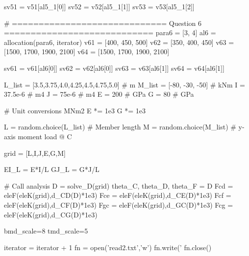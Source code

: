 \documentclass[a4paper,11pt]{article}
\begin{document}
\begin{pycode}
	sv51 = v51[al5_1[0]]
	sv52 = v52[al5_1[1]]
	sv53 = v53[al5_1[2]]
	
	# ============================= Question 6 ============================
	para6 = [3, 4]
	al6 = allocation(para6, iterator)
	v61 = [400, 450, 500]
	v62 = [350, 400, 450]
	v63 = [1500, 1700, 1900, 2100]
	v64 = [1500, 1700, 1900, 2100]
	
	sv61 = v61[al6[0]]
	sv62 = v62[al6[0]]
	sv63 = v63[al6[1]]
	sv64 = v64[al6[1]]
	
	L_list = [3.5,3.75,4.0,4.25,4.5,4.75,5.0]  # m
	M_list = [-80, -30, -50]	# kNm
	I = 37.5e-6 	# m4
	J = 75e-6   	# m4
	E = 200     	# GPa
	G = 80      	# GPa
	
	# Unit conversions MNm2
	E *= 1e3
	G *= 1e3
	
	L = random.choice(L_list) 		# Member length
	M = random.choice(M_list) 		# y-axis moment load @ C
	
	grid = [L,I,J,E,G,M]
	
	EI_L = E*I/L
	GJ_L = G*J/L
	
	# Call analysis
	D = solve_D(grid)
	theta_C, theta_D, theta_F = D
	Fcd = eleF(eleK(grid),d_CD(D)*1e3)
	Fce = eleF(eleK(grid),d_CE(D)*1e3)
	Fcf = eleF(eleK(grid),d_CF(D)*1e3)
	Fgc = eleF(eleK(grid),d_GC(D)*1e3)
	Fcg = eleF(eleK(grid),d_CG(D)*1e3)
	
	bmd_scale=8
	tmd_scale=5
	
	iterator = iterator + 1
	fn = open('read2.txt','w')
	fn.write('%
	fn.close()
\end{pycode}
\end{document}
